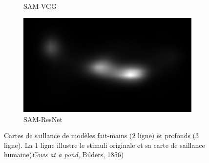 \begin{figure}[ht]
\begin{subfigure}{0.24\textwidth}
        \caption{SAM-VGG}
    \end{subfigure}
    \begin{subfigure}{0.24\textwidth}
        \includegraphics[width=\linewidth]{datas/predictions/sam_resnet_cows_at_a_pond_Bilders_1856.jpg}
        \caption{SAM-ResNet}
    \end{subfigure}
     
    \caption{Cartes de saillance de modèles fait-mains (2 ligne) et profonds (3 ligne). La 1 ligne illustre le stimuli originale et sa carte de saillance humaine(\emph{Cows at a pond}, Bilders, 1856)}
    \label{fig:saliencyModel}
\end{figure}

\vfill

